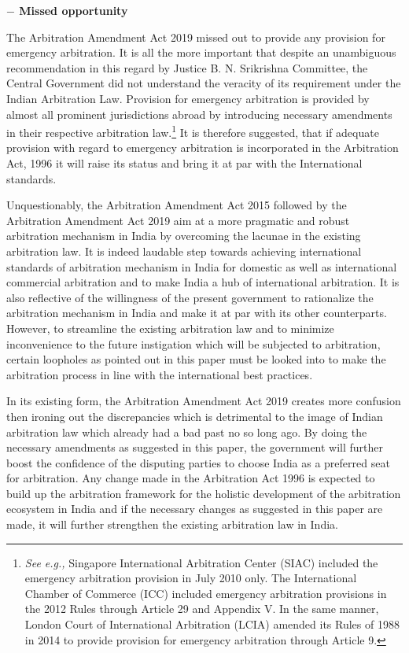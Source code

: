 \begin{multicols}{2}
\noi
{\large \bfseries $-$ Missed opportunity}

\noi
The Arbitration Amendment Act 2019 missed out to provide any provision for emergency
arbitration. It is all the more important that despite an unambiguous recommendation in this
regard by Justice B. N. Srikrishna Committee, the Central Government did not understand the
veracity of its requirement under the Indian Arbitration Law. Provision for emergency
arbitration is provided by almost all prominent jurisdictions abroad by introducing necessary
amendments in their respective arbitration law.\footnote{\textit{See e.g.,} Singapore International Arbitration Center (SIAC) included the emergency arbitration provision in July 2010 only. The International Chamber of Commerce (ICC) included emergency arbitration provisions in the 2012 Rules through Article 29 and Appendix V. In the same manner, London Court of International
Arbitration (LCIA) amended its Rules of 1988 in 2014 to provide provision for emergency arbitration through
Article 9.} It is therefore suggested, that if adequate
provision with regard to emergency arbitration is incorporated in the Arbitration Act, 1996 it
will raise its status and bring it at par with the International standards.


\noi
Unquestionably, the Arbitration Amendment Act 2015 followed by the Arbitration
Amendment Act 2019 aim at a more pragmatic and robust arbitration mechanism in India by
overcoming the lacunae in the existing arbitration law. It is indeed laudable step towards
achieving international standards of arbitration mechanism in India for domestic as well as
international commercial arbitration and to make India a hub of international arbitration. It is
also reflective of the willingness of the present government to rationalize the arbitration
mechanism in India and make it at par with its other counterparts. However, to streamline the
existing arbitration law and to minimize inconvenience to the future instigation which will be
subjected to arbitration, certain loopholes as pointed out in this paper must be looked into to
make the arbitration process in line with the international best practices.

\noi
In its existing form, the Arbitration Amendment Act 2019 creates more confusion then
ironing out the discrepancies which is detrimental to the image of Indian arbitration law which already had a bad past no so long ago. By doing the necessary amendments as
suggested in this paper, the government will further boost the confidence of the disputing
parties to choose India as a preferred seat for arbitration. Any change made in the Arbitration
Act 1996 is expected to build up the arbitration framework for the holistic development of the
arbitration ecosystem in India and if the necessary changes as suggested in this paper are
made, it will further strengthen the existing arbitration law in India.
\end{multicols}
\label{end2019-art5}
